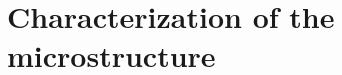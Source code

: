 \documentclass{sintefbeamer}
\begin{document}
  


\section{Characterization of the microstructure}
\section*{}




\end{document}
